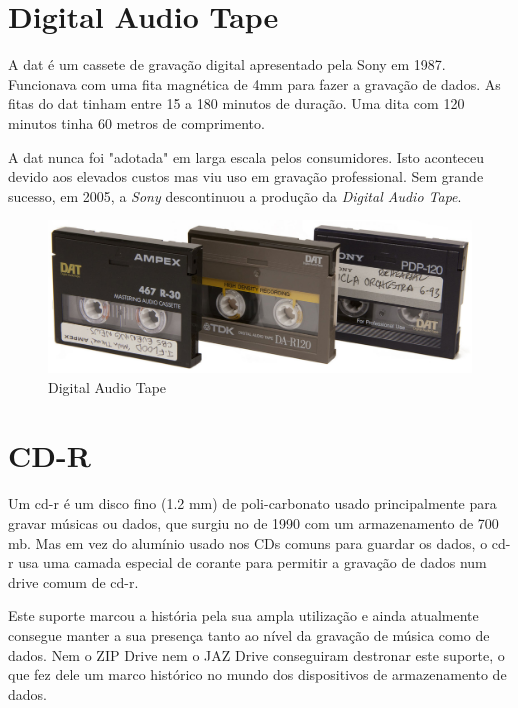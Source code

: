 \documentclass{report}
\begin{document}
		\section{Digital Audio Tape}
	A \ac{dat} é um cassete de gravação digital apresentado pela Sony em 1987.	
	Funcionava com uma fita magnética de 4mm para fazer a gravação de dados. As fitas do \ac{dat} tinham entre 15 a 180 minutos de duração. Uma dita com 120 minutos tinha 60 metros de comprimento.
	
	A \ac{dat} nunca foi "adotada" em larga escala pelos consumidores. Isto aconteceu devido aos elevados custos mas viu uso em gravação professional.
	Sem grande sucesso, em 2005, a \textit{Sony} descontinuou a produção da \textit{Digital Audio Tape}.
	 
	
	\begin{figure} [h]
		\centering
		\includegraphics[scale=0.3]{dat.jpg}
		\caption{Digital Audio Tape}
	\end{figure}

\newpage
	

		\section{CD-R}
	
	Um \ac{cd-r} é um disco fino (1.2 mm) de poli-carbonato usado principalmente para gravar músicas ou dados, que surgiu no de 1990 com um armazenamento de 700 \ac{mb}. Mas em vez do alumínio usado nos CDs comuns para guardar os dados, o \ac{cd-r} usa uma camada especial de corante para permitir a gravação de dados num drive comum de \ac{cd-r}.
\vspace{1mm}

	Este suporte marcou a história pela sua ampla utilização e ainda atualmente consegue manter a sua presença tanto ao nível da gravação de música como de dados. Nem o ZIP Drive nem o JAZ Drive conseguiram destronar este suporte, o que fez dele um marco histórico no mundo dos dispositivos de armazenamento de dados.
\vspace{1mm}
\end{document}
